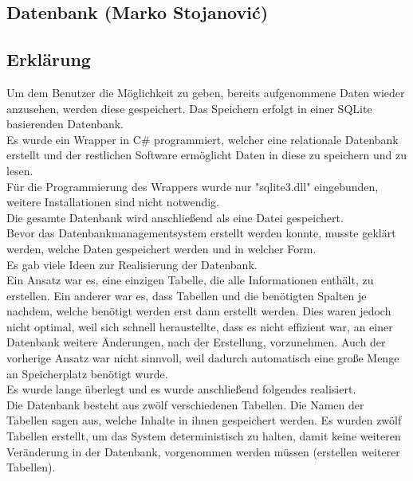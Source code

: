\documentclass[12pt,a4paper]{report}
\begin{document}
\begin{onehalfspace}
\chapter{Datenbank (Marko Stojanovi\'{c})}

\section{Erklärung}
Um dem Benutzer die Möglichkeit zu geben, bereits aufgenommene Daten wieder anzusehen, werden diese gespeichert. Das Speichern erfolgt in einer SQLite basierenden Datenbank.\\
Es wurde ein Wrapper in C\# programmiert, welcher eine relationale Datenbank erstellt und der restlichen Software ermöglicht Daten in diese zu speichern und zu lesen.\\
Für die Programmierung des Wrappers wurde nur "{}sqlite3.dll"{} eingebunden, weitere Installationen sind nicht notwendig.\\
Die gesamte Datenbank wird anschließend als eine Datei gespeichert.\\

Bevor das Datenbankmanagementsystem erstellt werden konnte, musste geklärt werden, welche Daten gespeichert werden und in welcher Form.\\

Es gab viele Ideen zur Realisierung der Datenbank. 
\\Ein Ansatz war es, eine einzigen Tabelle, die alle Informationen enthält, zu erstellen. Ein anderer war es, dass Tabellen und die benötigten Spalten je nachdem, welche benötigt werden erst dann erstellt werden. Dies waren jedoch nicht optimal, weil sich schnell heraustellte, dass es nicht effizient war, an einer Datenbank weitere Änderungen, nach der Erstellung, vorzunehmen. Auch der vorherige Ansatz war nicht sinnvoll, weil dadurch automatisch eine große Menge an Speicherplatz benötigt wurde.\\

Es wurde lange überlegt und es wurde anschließend folgendes realisiert.\\

Die Datenbank besteht aus zwölf verschiedenen Tabellen. Die Namen der Tabellen sagen aus, welche Inhalte in ihnen gespeichert werden. Es wurden zwölf Tabellen erstellt, um das System deterministisch zu halten, damit keine weiteren Veränderung in der Datenbank, vorgenommen werden müssen (erstellen weiterer Tabellen).\\


\end{onehalfspace}
\end{document}
